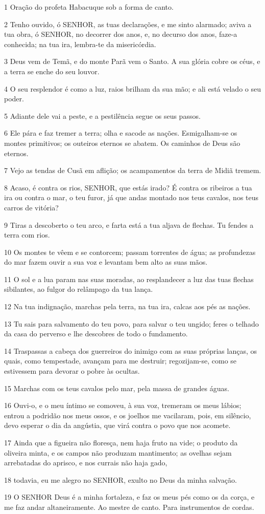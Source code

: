\par 1 Oração do profeta Habacuque sob a forma de canto.
\par 2 Tenho ouvido, ó SENHOR, as tuas declarações, e me sinto alarmado; aviva a tua obra, ó SENHOR, no decorrer dos anos, e, no decurso dos anos, faze-a conhecida; na tua ira, lembra-te da misericórdia.
\par 3 Deus vem de Temã, e do monte Parã vem o Santo. A sua glória cobre os céus, e a terra se enche do seu louvor.
\par 4 O seu resplendor é como a luz, raios brilham da sua mão; e ali está velado o seu poder.
\par 5 Adiante dele vai a peste, e a pestilência segue os seus passos.
\par 6 Ele pára e faz tremer a terra; olha e sacode as nações. Esmigalham-se os montes primitivos; os outeiros eternos se abatem. Os caminhos de Deus são eternos.
\par 7 Vejo as tendas de Cusã em aflição; os acampamentos da terra de Midiã tremem.
\par 8 Acaso, é contra os rios, SENHOR, que estás irado? É contra os ribeiros a tua ira ou contra o mar, o teu furor, já que andas montado nos teus cavalos, nos teus carros de vitória?
\par 9 Tiras a descoberto o teu arco, e farta está a tua aljava de flechas. Tu fendes a terra com rios.
\par 10 Os montes te vêem e se contorcem; passam torrentes de água; as profundezas do mar fazem ouvir a sua voz e levantam bem alto as suas mãos.
\par 11 O sol e a lua param nas suas moradas, ao resplandecer a luz das tuas flechas sibilantes, ao fulgor do relâmpago da tua lança.
\par 12 Na tua indignação, marchas pela terra, na tua ira, calcas aos pés as nações.
\par 13 Tu sais para salvamento do teu povo, para salvar o teu ungido; feres o telhado da casa do perverso e lhe descobres de todo o fundamento.
\par 14 Traspassas a cabeça dos guerreiros do inimigo com as suas próprias lanças, os quais, como tempestade, avançam para me destruir; regozijam-se, como se estivessem para devorar o pobre às ocultas.
\par 15 Marchas com os teus cavalos pelo mar, pela massa de grandes águas.
\par 16 Ouvi-o, e o meu íntimo se comoveu, à sua voz, tremeram os meus lábios; entrou a podridão nos meus ossos, e os joelhos me vacilaram, pois, em silêncio, devo esperar o dia da angústia, que virá contra o povo que nos acomete.
\par 17 Ainda que a figueira não floresça, nem haja fruto na vide; o produto da oliveira minta, e os campos não produzam mantimento; as ovelhas sejam arrebatadas do aprisco, e nos currais não haja gado,
\par 18 todavia, eu me alegro no SENHOR, exulto no Deus da minha salvação.
\par 19 O SENHOR Deus é a minha fortaleza, e faz os meus pés como os da corça, e me faz andar altaneiramente. Ao mestre de canto. Para instrumentos de cordas.


